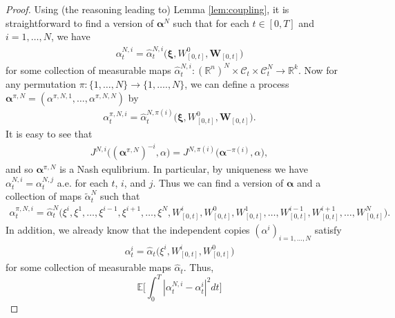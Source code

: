 \documentclass[11pt,reqno]{amsart}
\numberwithin{equation}{section}
\theoremstyle{definition}
\def\E{{\mathbb E}}
\def\R{{\mathbb R}}
\newcommand{\wt}{\widetilde}
\newcommand\cC{\mathcal C}
\def \E{\mathbb{E}}
\def \R{\mathbb{R}}
\begin{document}
\begin{proof}
Using (the reasoning leading to) Lemma \ref{lem:coupling}, it is straightforward to find a version of $\bm \alpha^N$ such that for each $t \in [0,T]$ and $i = 1,\dots,N$, we have 
\begin{align*}
    \alpha_t^{N,i} = \widehat{\alpha}^{N,i}_t\big(\boldsymbol{\xi}, W^0_{[0,t]},\mathbf{W}_{[0,t]}\big) %
\end{align*}
for some collection of measurable maps $\widehat{\alpha}^{N,i}_t :  (\R^n)^{N} \times \cC_t \times \cC_t^{N} \to \R^k$. Now for any permutation $\pi : \{1,\dots,N\} \to \{1,\dots.,N\}$, we can define a process $\bm \alpha^{\pi,N} = (\alpha^{\pi, N,1},\dots,\alpha^{\pi,N,N})$ by 
\begin{align*}
    \alpha^{\pi,N,i}_t = \widehat{\alpha}^{N,\pi(i)}_t\big(\boldsymbol{\xi}, W^0_{[0,t]},\mathbf{W}_{[0,t]}\big).%
\end{align*} 
It is easy to see that 
\begin{align*}
    J^{N,i}\big( ( \bm \alpha^{\pi, N})^{-i}, \alpha) = J^{N, \pi(i)} \big( \bm \alpha^{- \pi(i)}, \alpha), 
\end{align*}
and so $\bm \alpha^{\pi,N}$ is a Nash equlibrium.
In particular, by uniqueness we have $\alpha_t^{N,i} = \alpha_t^{N,j}$ a.e. for each $t$, $i$, and $j$. Thus we can find a version of $\bm \alpha$ and a collection of maps $\wt{\alpha}_t^N$ such that 
\begin{align*}
    \alpha^{\pi,N,i}_t = \widehat{\alpha}^{N}_t \big(\xi^i,\xi^1,\dots,\xi^{i-1},\xi^{i+1},\dots,\xi^N,W^i_{[0,t]}, W^0_{[0,t]}, W^1_{[0,t]}, \dots, W^{i-1}_{[0,t]}, W^{i+1}_{[0,t]},\dots,W^N_{[0,t]}\big).
\end{align*}
In addition, we already know that the independent copies $(\alpha^i)_{i = 1,\dots,N}$ satisfy
\begin{align*}
    \alpha^i_t = \widehat{\alpha}_t\big(\xi^i, W^i_{[0,t]}, W^0_{[0,t]}\big)
\end{align*}
for some collection of measurable maps $\widehat{\alpha}_t$. Thus,
\begin{equation*}
    \E\bigg[\int_0^T |\alpha_t^{N,i} - \alpha_t^i|^2 dt \bigg]
\end{equation*}

\end{proof}
\end{document}
